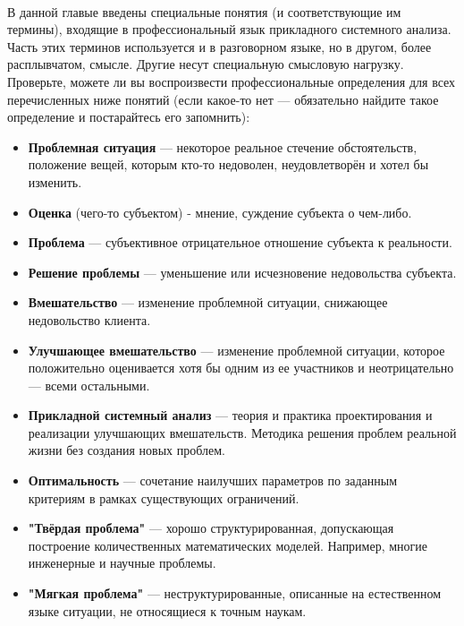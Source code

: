 \documentclass{article}
\newcommand{\important}[1]{\textbf{#1}}
\begin{document}
\\
В данной главые введены специальные понятия (и соответствующие им термины), входящие в профессиональный язык прикладного системного анализа. Часть этих терминов используется и в разговорном языке, но в другом, более расплывчатом, смысле. Другие несут специальную смысловую нагрузку. Проверьте, можете ли вы воспроизвести профессиональные определения для всех перечисленных ниже понятий (если какое-то нет --- обязательно найдите такое определение и постарайтесь его запомнить):
\begin{itemize}
	\item \important{Проблемная ситуация} --- некоторое реальное стечение обстоятельств, положение вещей, которым кто-то недоволен, неудовлетворён и хотел бы изменить.
	\item \important{Оценка} (чего-то субъектом) - мнение, суждение субъекта о чем-либо.
	\item \important{Проблема} --- субъективное отрицательное отношение субъекта к реальности.
	\item \important{Решение проблемы} --- уменьшение или исчезновение недовольства субъекта.
	\item \important{Вмешательство} --- изменение проблемной ситуации, снижающее недовольство клиента.
	\item \important{Улучшающее вмешательство} --- изменение проблемной ситуации, которое положительно оценивается хотя бы одним из ее участников и неотрицательно --- всеми остальными.
	\item \important{Прикладной системный анализ} --- теория и практика проектирования и реализации улучшающих вмешательств. Методика решения проблем реальной жизни без создания новых проблем.
	\item \important{Оптимальность} --- сочетание наилучших параметров по заданным критериям в рамках существующих ограничений.
	\item \important{"Твёрдая проблема"} --- хорошо структурированная, допускающая построение количественных математических моделей. Например, многие инженерные и научные проблемы.
	\item \important{"Мягкая проблема"} --- неструктурированные, описанные на естественном языке ситуации, не относящиеся к точным наукам.
\end{itemize}
\end{document}
